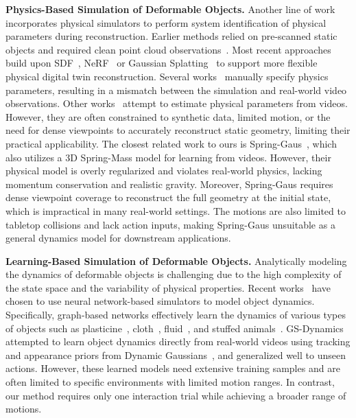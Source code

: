 \textbf{Physics-Based Simulation of Deformable Objects.} 
Another line of work incorporates physical simulators to perform system identification of physical parameters during reconstruction. Earlier methods relied on pre-scanned static objects and required clean point cloud observations~\cite{wang2015deformation, Qiao2021Differentiable, du2021diffpd, rojas2021differentiable, geilinger2020add, heiden2021disect, jatavallabhula2021gradsim, ma2022risp}. Most recent approaches build upon SDF~\cite{qiao2022neuphysics}, NeRF~\cite{feng2024pie, li2023pac, chen2022virtual} or Gaussian Splatting~\cite{zhang2024physdreamer, zhong2024reconstruction, xie2024physgaussian, jiang2024vr} to support more flexible physical digital twin reconstruction. 
Several works~\cite{feng2024pie, jiang2024vr, xie2024physgaussian} manually specify physics parameters, resulting in a mismatch between the simulation and real-world video observations. Other works~\cite{zhang2024physdreamer, li2023pac, chen2022virtual, zhong2024reconstruction, qiao2022neuphysics} attempt to estimate physical parameters from videos. However, they are often constrained to synthetic data, limited motion, or the need for dense viewpoints to accurately reconstruct static geometry, limiting their practical applicability.
The closest related work to ours is Spring-Gaus~\cite{zhong2024reconstruction}, which also utilizes a 3D Spring-Mass model for learning from videos. However, their physical model is overly regularized and violates real-world physics, lacking momentum conservation and realistic gravity. Moreover, Spring-Gaus requires dense viewpoint coverage to reconstruct the full geometry at the initial state, which is impractical in many real-world settings. The motions are also limited to tabletop collisions and lack action inputs, making Spring-Gaus unsuitable as a general dynamics model for downstream applications.


\textbf{Learning-Based Simulation of Deformable Objects.} 
Analytically modeling the dynamics of deformable objects is challenging due to the high complexity of the state space and the variability of physical properties. Recent works~\cite{wu2019learning, ma2023learning, xu2019densephysnet, evans2022context, chen2022comphy} have chosen to use neural network-based simulators to model object dynamics. Specifically, graph-based networks effectively learn the dynamics of various types of objects such as plasticine~\cite{shi2024robocraft, shi2023robocook}, cloth~\cite{pfaff2020learning, lin2022learning}, fluid~\cite{li2018learning, sanchez2020learning}, and stuffed animals~\cite{zhang2024dynamic}. GS-Dynamics~\cite{zhang2024dynamic} attempted to learn object dynamics directly from real-world videos using tracking and appearance priors from Dynamic Gaussians~\cite{luiten2024dynamic}, and generalized well to unseen actions. However, these learned models need extensive training samples and are often limited to specific environments with limited motion ranges. In contrast, our method requires only one interaction trial while achieving a broader range of motions.
